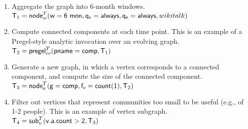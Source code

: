 \begin{enumerate}[noitemsep,itemindent=\dimexpr\labelwidth+\labelsep\relax,leftmargin=0pt]
\item Aggregate the graph into 6-month windows.\\
$\mathsf{T}_1 = \textsf{node}^T_w(\mathsf{w=6~mon},\mathsf{q_v=always},\mathsf{q_e=always},wikitalk)$

\item Compute connected components at each time point.  This is an
  example of a Pregel-style analytic invocation over an evolving
  graph. $\mathsf{T}_2 = \textsf{pregel}^T_{cc} (\mathsf{pname=comp}, \mathsf{T}_1)$



\item Generate a new graph, in which a vertex corresponds to a
  connected component, and compute the size of the connected
  component. $\mathsf{T}_3 =
  \textsf{node}^T_a(\mathsf{g=comp,f_v=count(1)},\mathsf{T}_2)$


\item Filter out vertices that represent communities too small to be
  useful (e.g., of 1-2 people).  This is an example of vertex
  subgraph.  $\mathsf{T}_4 = \textsf{sub}^T_v(\mathsf{v.a.count > 2},\mathsf{T}_3)$

\end{enumerate}

